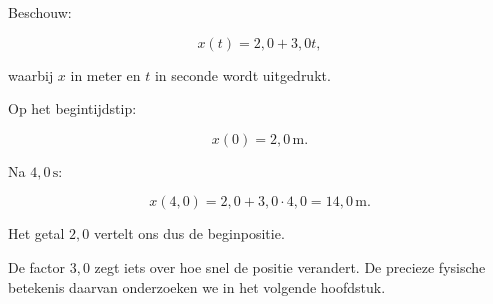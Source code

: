 \documentclass{ximera}
\begin{document}
\begin{voorbeeld}

Beschouw:

\[
x(t)=2,0+3,0t,
\]

waarbij $x$ in meter en $t$ in seconde wordt uitgedrukt.

Op het begintijdstip:

\[
x(0)=2,0\,\mathrm{m}.
\]

Na $4,0\,\mathrm{s}$:

\[
x(4,0)
=
2,0+3,0\cdot4,0
=
14,0\,\mathrm{m}.
\]

Het getal $2,0$ vertelt ons dus de beginpositie.

De factor $3,0$ zegt iets over hoe snel de positie verandert.
De precieze fysische betekenis daarvan onderzoeken we in het
volgende hoofdstuk.

\end{voorbeeld}


\end{document}
